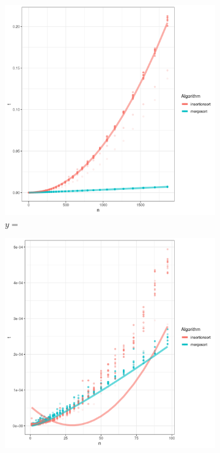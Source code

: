 \begin{figure} \centering
	\begin{subfigure}[b]{0.45\textwidth}
		\centering
		\includegraphics[width=\textwidth]{../img/toAlgoritmer.png}
		\caption{$y=$}
		\label{fig:regressioner}
	\end{subfigure}
	\hfill
	\begin{subfigure}[b]{0.45\textwidth}
		\centering
		\includegraphics[width=\textwidth]{../img/toAlgoritmerZoomed}

\end{subfigure}
\end{figure}
